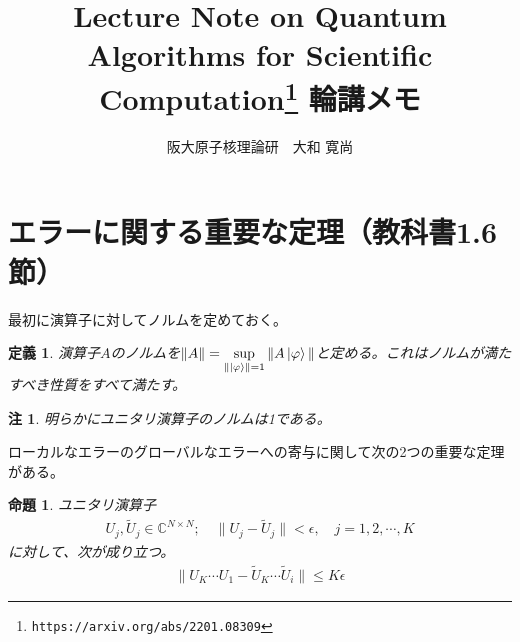 \documentclass[dvipdfmx]{jarticle}
\title{{\bf Lecture Note on Quantum Algorithms for Scientific Computation\footnote{\texttt{https://arxiv.org/abs/2201.08309}} 輪講メモ}}
\author{阪大原子核理論研　大和 寛尚}
\date{}
\numberwithin{equation}{section}
\theoremstyle{seminar}
\newtheorem{definition}{定義}[section]
\newtheorem{proposition}{命題}[section]
\newtheorem{remark}{注}[section]
\begin{document}
\maketitle
\section{エラーに関する重要な定理（教科書1.6節）}
最初に演算子に対してノルムを定めておく。
\begin{definition}
  演算子$A$のノルムを${\displaystyle \| A \| = \sup_{\|\ket{\varphi}\| = 1} \| A \ket{\varphi} \|}$と定める。これはノルムが満たすべき性質をすべて満たす。
\end{definition}
\begin{remark}
  明らかにユニタリ演算子のノルムは1である。
\end{remark}
ローカルなエラーのグローバルなエラーへの寄与に関して次の2つの重要な定理がある。
\begin{proposition}
  ユニタリ演算子
  \begin{align}
    U_j, \tilde{U}_j \in \mathbb{C}^{N \times N} ; \quad \| U_j - \tilde{U}_j\| < \epsilon, \quad j = 1, 2, \cdots, K
  \end{align}
  に対して、次が成り立つ。
  \begin{align}
    \| U_K \cdots U_1 - \tilde{U}_K \cdots \tilde{U}_i \| \leq K\epsilon
  \end{align}
\end{proposition}
\end{document}
